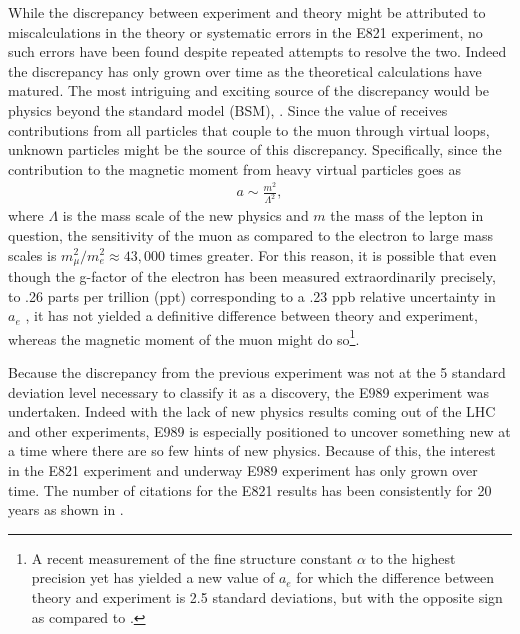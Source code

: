 While the discrepancy between experiment and theory might be attributed to miscalculations in the theory or systematic errors in the E821 experiment, no such errors have been found despite repeated attempts to resolve the two. Indeed the discrepancy has only grown over time as the theoretical calculations have matured. The most intriguing and exciting source of the discrepancy would be physics beyond the standard model (BSM), . Since the value of \amu receives contributions from all particles that couple to the muon through virtual loops, unknown particles might be the source of this discrepancy. Specifically, since the contribution to the magnetic moment from heavy virtual particles goes as 
		\begin{align}
            a \sim \frac{m^{2}}{\Lambda^{2}},
		\end{align}
where $\Lambda$ is the mass scale of the new physics and $m$ the mass of the lepton in question, the sensitivity of the muon as compared to the electron to large mass scales is $ m_{\mu}^{2} / m_{e}^{2} \approx 43,000$ times greater. For this reason, it is possible that even though the g-factor of the electron has been measured extraordinarily precisely, to .26 parts per trillion (ppt) corresponding to a .23 ppb relative uncertainty in $a_{e}$ \cite{ElectronMDM,CODATA}, it has not yielded a definitive difference between theory and experiment, whereas the magnetic moment of the muon might do so\footnote{A recent measurement of the fine structure constant $\alpha$ to the highest precision yet \cite{finestructureBerkeley} has yielded a new value of $a_{e}$ for which the difference between theory and experiment is 2.5 standard deviations, but with the opposite sign as compared to \amu.}.

Because the discrepancy from the previous experiment was not at the 5 standard deviation level necessary to classify it as a discovery, the E989 experiment was undertaken. Indeed with the lack of new physics results coming out of the LHC and other experiments, E989 is especially positioned to uncover something new at a time where there are so few hints of new physics. Because of this, the interest in the E821 experiment and underway E989 experiment has only grown over time. The number of citations for the E821 results has been consistently for 20 years as shown in .

